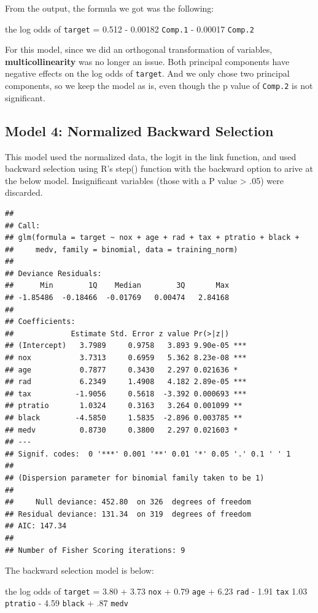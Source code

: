 \documentclass[]{article}
\begin{document}
From the output, the formula we got was the following:

the log odds of \texttt{target} = 0.512 - 0.00182 \texttt{Comp.1} -
0.00017 \texttt{Comp.2}

For this model, since we did an orthogonal transformation of variables,
\textbf{multicollinearity} was no longer an issue. Both principal
components have negative effects on the log odds of \texttt{target}. And
we only chose two principal components, so we keep the model as is, even
though the p value of \texttt{Comp.2} is not significant.

\subsection{Model 4: Normalized Backward
Selection}\label{model-4-normalized-backward-selection}

This model used the normalized data, the logit in the link function, and
used backward selection using R's step() function with the backward
option to arive at the below model. Insignificant variables (those with
a P value \textgreater{} .05) were discarded.

\begin{verbatim}
## 
## Call:
## glm(formula = target ~ nox + age + rad + tax + ptratio + black + 
##     medv, family = binomial, data = training_norm)
## 
## Deviance Residuals: 
##      Min        1Q    Median        3Q       Max  
## -1.85486  -0.18466  -0.01769   0.00474   2.84168  
## 
## Coefficients:
##             Estimate Std. Error z value Pr(>|z|)    
## (Intercept)   3.7989     0.9758   3.893 9.90e-05 ***
## nox           3.7313     0.6959   5.362 8.23e-08 ***
## age           0.7877     0.3430   2.297 0.021636 *  
## rad           6.2349     1.4908   4.182 2.89e-05 ***
## tax          -1.9056     0.5618  -3.392 0.000693 ***
## ptratio       1.0324     0.3163   3.264 0.001099 ** 
## black        -4.5850     1.5835  -2.896 0.003785 ** 
## medv          0.8730     0.3800   2.297 0.021603 *  
## ---
## Signif. codes:  0 '***' 0.001 '**' 0.01 '*' 0.05 '.' 0.1 ' ' 1
## 
## (Dispersion parameter for binomial family taken to be 1)
## 
##     Null deviance: 452.80  on 326  degrees of freedom
## Residual deviance: 131.34  on 319  degrees of freedom
## AIC: 147.34
## 
## Number of Fisher Scoring iterations: 9
\end{verbatim}

The backward selection model is below:

the log odds of \texttt{target} = 3.80 + 3.73 \texttt{nox} + 0.79
\texttt{age} + 6.23 \texttt{rad} - 1.91 \texttt{tax} 1.03
\texttt{ptratio} - 4.59 \texttt{black} + .87 \texttt{medv}
\end{document}
